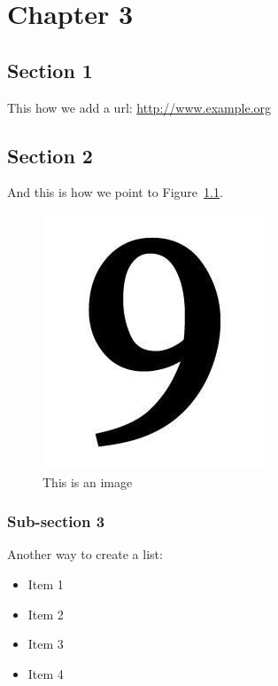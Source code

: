 \chapter{Chapter 3}\label{ch:ch3}

\section{Section 1}

This how we add a url: \url{http://www.example.org}

\section{Section 2}

And this is how we point to Figure~\ref{fig:image1}.

\begin{figure}[hb]
	\centering
	\includegraphics[]{diagrams/9.jpg}
	\caption{This is an image}
	\label{fig:image1}
\end{figure}

\subsection{Sub-section 3}

Another way to create a list:
\begin{itemize}
	\item Item 1
	\item Item 2
	\item Item 3
	\item Item 4
\end{itemize}

